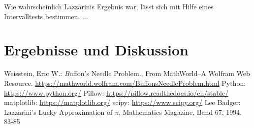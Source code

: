 \documentclass[10pt,twocolumn]{scrartcl}
\begin{document}
	Wie wahrscheinlich Lazzarinis Ergebnis war, lässt sich mit Hilfe eines Intervalltests bestimmen. ...
\section*{Ergebnisse und Diskussion}

\begin{thebibliography}{99}
	Weisstein, Eric W.: {\textit Buffon's Needle Problem.}, From MathWorld--A Wolfram Web Resource. \url{https://mathworld.wolfram.com/BuffonsNeedleProblem.html}
	Python: \url{https://www.python.org/}
	Pillow: \url{https://pillow.readthedocs.io/en/stable/}
	matplotlib: \url{https://matplotlib.org/}
	scipy: \url{https://www.scipy.org/}
	Lee Badger: Lazzarini’s Lucky Approximation of $\pi$, Mathematics Magazine, Band 67, 1994, 83-85
\end{thebibliography}
\end{document}
